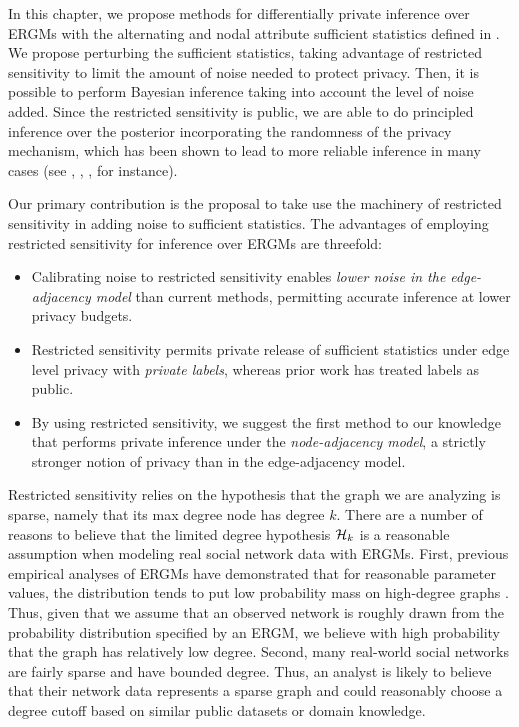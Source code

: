 In this chapter, we propose methods for differentially private inference over ERGMs with the alternating and nodal attribute sufficient statistics defined in . We propose perturbing the sufficient statistics, taking advantage of restricted sensitivity to limit the amount of noise needed to protect privacy. Then, it is possible to perform Bayesian inference taking into account the level of noise added. Since the restricted sensitivity is public, we are able to do principled inference over the posterior incorporating the randomness of the privacy mechanism, which has been shown to lead to more reliable inference in many cases (see \cite{FGWC16}, \cite{KS16}, \cite{KKS17}, \cite{LM14} for instance). 

Our primary contribution is the proposal to take use the machinery of restricted sensitivity in adding noise to sufficient statistics. The advantages of employing restricted sensitivity for inference over ERGMs are threefold:
\begin{itemize}
	\item Calibrating noise to restricted sensitivity enables \emph{lower noise in the edge-adjacency model} than current methods, permitting accurate inference at lower privacy budgets.
	\item Restricted sensitivity permits private release of sufficient statistics under edge level privacy with \emph{private labels}, whereas prior work has treated labels as public.
	\item By using restricted sensitivity, we suggest the first method to our knowledge that performs private inference under the \emph{node-adjacency model}, a strictly stronger notion of privacy than in the edge-adjacency model.
\end{itemize} 

Restricted sensitivity relies on the hypothesis that the graph we are analyzing is sparse, namely that its max degree node has degree $k$.  There are a number of reasons to believe that the limited degree hypothesis $\mathcal{H}_k$ is a reasonable assumption when modeling real social network data with ERGMs. First, previous empirical analyses of ERGMs have demonstrated that for reasonable parameter values, the distribution tends to put low probability mass on high-degree graphs \cite{Sni+06}. Thus, given that we assume that an observed network is roughly drawn from the probability distribution specified by an ERGM, we believe with high probability that the graph has relatively low degree. Second, many real-world social networks are fairly sparse and have bounded degree. Thus, an analyst is likely to believe that their network data represents a sparse graph and could reasonably choose a degree cutoff based on similar public datasets or domain knowledge.  

